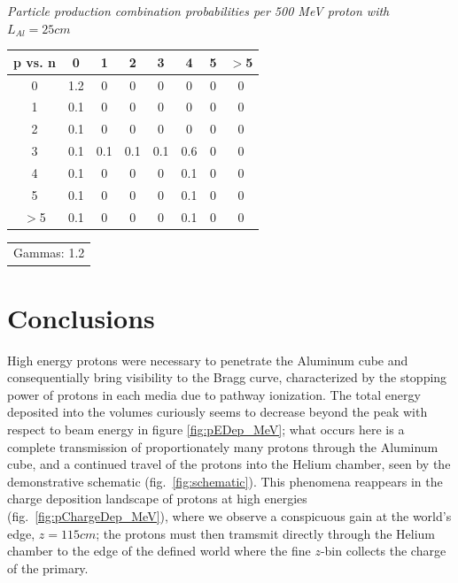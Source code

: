 \documentclass[11pt]{article}
\makeatletter
\newenvironment{tablehere}
{\def\@captype{table}}{}
\makeatother
\begin{document}
\begin{multicols}{2}
\begin{tablehere}
\begin{centering}
  \label{tab:production_pAl10}
\end{centering}\end{tablehere}
\vspace{0.15 cm}
\begin{tablehere}\begin{centering}
  \caption{\small \emph{Particle production combination probabilities per 500 MeV proton with $L_{Al}=25 cm$}}
  \begin{tabular}{c || c c c c c c c}
    p vs. n & 0 & 1 & 2 & 3 & 4 & 5 & $>$5 \\
    \hline\hline
    0 & 1.2 & 0 & 0 & 0 & 0 & 0 & 0 \\
    1 & 0.1 & 0 & 0 & 0 & 0 & 0 & 0 \\
    2 & 0.1 & 0 & 0 & 0 & 0 & 0 & 0 \\
    3 & 0.1 & 0.1 & 0.1 & 0.1 & 0.6 & 0 & 0 \\
    4 & 0.1 & 0 & 0 & 0 & 0.1 & 0 & 0 \\
    5 & 0.1 & 0 & 0 & 0 & 0.1 & 0 & 0 \\
    $>$5 & 0.1 & 0 & 0 & 0 & 0.1 & 0 & 0 \\
    \hline\hline
  \end{tabular}
  \begin{tabular}{r} Gammas: 1.2 \end{tabular}  
  \label{tab:production_pAl25}
\end{centering}\end{tablehere}
\vspace{0.15 cm}

\section{Conclusions}

High energy protons were necessary to penetrate the Aluminum cube and consequentially bring visibility to the Bragg curve, characterized by the stopping power of protons in each media due to pathway ionization.  The total energy deposited into the volumes curiously seems to decrease beyond the peak with respect to beam energy in figure \ref{fig:pEDep_MeV}; what occurs here is a complete transmission of proportionately many protons through the Aluminum cube, and a continued travel of the protons into the Helium chamber, seen by the demonstrative schematic (fig.~\ref{fig:schematic}).  This phenomena reappears in the charge deposition landscape of protons at high energies (fig.~\ref{fig:pChargeDep_MeV}), where we observe a conspicuous gain at the world's edge, $z=115cm$; the protons must then tramsmit directly through the Helium chamber to the edge of the defined world where the fine $z$-bin collects the charge of the primary.


\end{multicols}
\end{document}
